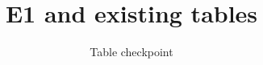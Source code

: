 

\title{E1 and existing tables}
\author{Table checkpoint}
\renewcommand{\shortauthors}{Table checkpoint}
\maketitle
\vldbtopmatter








\clearpage

